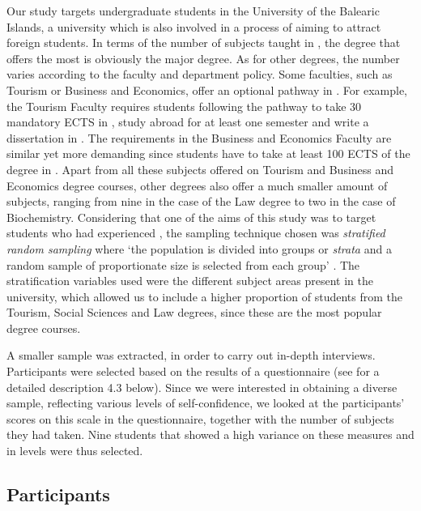 \documentclass[output=paper]{langsci/langscibook}
\begin{document}
Our study targets undergraduate students in the University of the Balearic Islands, a university which is also involved in a process of  aiming to attract foreign students.  In terms of the number of subjects taught in , the degree that offers the most is obviously the  major degree. As for other degrees, the number varies according to the faculty and department policy. Some faculties, such as Tourism or Business and Economics, offer an optional pathway in . For example, the Tourism Faculty requires students following the pathway to take 30 mandatory ECTS in , study abroad for at least one semester and write a dissertation in . The requirements in the Business and Economics Faculty are similar yet more demanding since students have to take at least 100 ECTS of the degree in . Apart from all these  subjects offered on Tourism and Business and Economics degree courses, other degrees also offer a much smaller amount of  subjects, ranging from nine in the case of the Law degree to two in the case of Biochemistry. Considering that one of the aims of this study was to target students who had experienced , the sampling technique chosen was \textit{stratified random sampling} where ‘the population is divided into groups or \textit{strata} and a random sample of proportionate size is selected from each group’ \citep[97]{Dörnyei2007}. The stratification variables used were the different subject areas present in the university, which allowed us to include a higher proportion of students from the Tourism, Social Sciences and Law degrees, since these are the most popular degree courses.



A smaller sample was extracted, in order to carry out in-depth interviews. Participants were selected based on the results of a questionnaire (see for a detailed description 4.3 below). Since we were interested in obtaining a diverse sample, reflecting various levels of  self-confidence, we looked at the participants’ scores on this scale in the questionnaire, together with the number of  subjects they had taken. Nine students that showed a high variance on these measures and in   levels were thus selected. 


\subsection{Participants}
\end{document}
